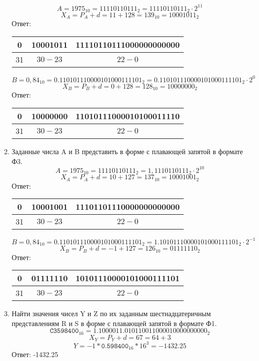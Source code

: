 \documentclass{article}
\begin{document}
\begin{enumerate}
            $$ 
                  A =
                  1975_{10} =
                  11110110111_2 = 
                  11110110111_2 \cdot 2^{11} $$
            $$ X_A = P_A + d = 11 + 128 = 139_{10} = 10001011_2 $$
            Ответ: \begin{tabular}{|c|c|c|}
                  \hline
                  0  & 10001011 & 11110110111000000000000 \\
                  \hline
                  31 & $30-23$  & $22-0$                  \\ 
                  \hline
            \end{tabular}
            $$ 
                  B =
                  0,84_{10} =
                  0.110101110000101000111101_{2} =
                  0.110101110000101000111101_{2} \cdot 2^0 $$
            $$ X_B = P_B + d = 0 + 128 = 128_{10} = 10000000_2 $$
            Ответ: \begin{tabular}{|c|c|c|}
                  \hline
                  0  & 10000000 & 11010111000010100011110 \\
                  \hline
                  31 & $30-23$  & $22-0$                  \\ 
                  \hline
            \end{tabular}
      \item Заданные числа A и B представить в форме с плавающей запятой в формате Ф3.
            $$ 
                  A =
                  1975_{10} =
                  11110110111_2 = 
                  1,1110110111_2 \cdot 2^{10} $$
            $$ X_A = P_A + d = 10 + 127 = 137_{10} = 10001001_2 $$
            Ответ: \begin{tabular}{|c|c|c|}
                  \hline
                  0  & 10001001 & 11101101110000000000000 \\
                  \hline
                  31 & $30-23$  & $22-0$                  \\ 
                  \hline
            \end{tabular}
            $$ 
                  B =
                  0,84_{10} =
                  0.110101110000101000111101_{2} =
                  1.10101110000101000111101_{2} \cdot 2^{-1} $$
            $$ X_B = P_B + d = -1 + 127 = 126_{10} = 01111110_2 $$
            Ответ: \begin{tabular}{|c|c|c|}
                  \hline
                  0  & 01111110 & 10101110000101000111101 \\
                  \hline
                  31 & $30-23$  & $22-0$                  \\ 
                  \hline
            \end{tabular}
      \item Найти значения чисел Y и Z по их заданным шестнадцатеричным представлениям R и S в форме с плавающей запятой в формате Ф1.
            $$ 
                  \texttt{C3598400}_{16} =
                  1.1000011.010110011000010000000000_2
            $$
            $$ X_Y = P_Y + d = 67 = 64 + 3 $$
            $$ Y = -1 * \texttt{0.598400}_{16} * 16^3 = -1432.25 $$
            Ответ: -1432.25
            

\end{enumerate}
\end{document}
